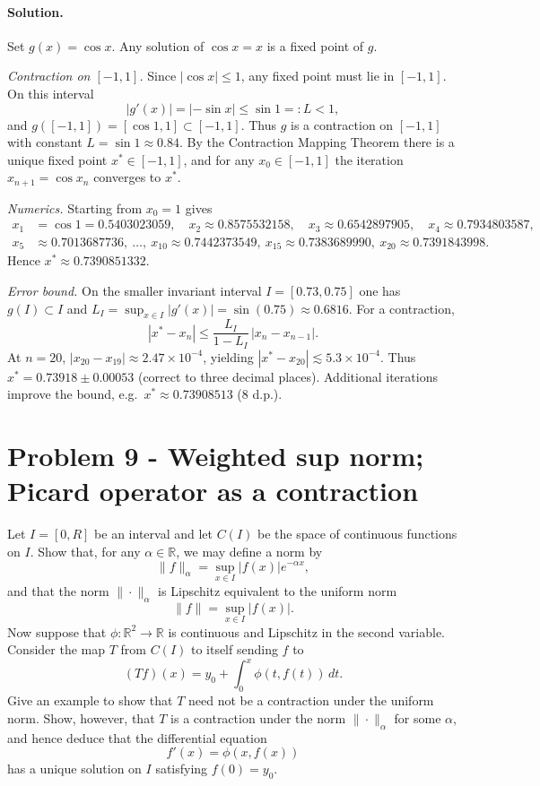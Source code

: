 \documentclass[12pt,a4paper]{article}
\theoremstyle{plain}
\theoremstyle{definition}
\theoremstyle{remark}
\theoremstyle{remark}
\begin{document}
\paragraph{Solution.}
Set $g(x)=\cos x$. Any solution of $\cos x=x$ is a fixed point of $g$.

\emph{Contraction on $[-1,1]$.}
Since $|\cos x|\le 1$, any fixed point must lie in $[-1,1]$. On this interval
\[
|g'(x)|=|-\sin x|\le \sin 1=:L<1,
\]
and $g([-1,1])=[\cos 1,1]\subset [-1,1]$. Thus $g$ is a contraction on $[-1,1]$
with constant $L=\sin 1\approx 0.84$. By the Contraction Mapping Theorem there is a unique
fixed point $x^\ast\in[-1,1]$, and for any $x_0\in[-1,1]$ the iteration $x_{n+1}=\cos x_n$
converges to $x^\ast$.

\emph{Numerics.}
Starting from $x_0=1$ gives
\[
\begin{aligned}
	x_1&=\cos 1=0.5403023059,\quad
	x_2\approx 0.8575532158,\quad
	x_3\approx 0.6542897905,\quad
	x_4\approx 0.7934803587,\\
	x_5&\approx 0.7013687736,\ \ldots,\
	x_{10}\approx 0.7442373549,\
	x_{15}\approx 0.7383689990,\
	x_{20}\approx 0.7391843998.
\end{aligned}
\]
Hence $x^\ast\approx 0.7390851332$.

\emph{Error bound.}
On the smaller invariant interval $I=[0.73,0.75]$ one has
$g(I)\subset I$ and $L_I=\sup_{x\in I}|g'(x)|=\sin(0.75)\approx 0.6816$.
For a contraction,
\[
|x^\ast-x_n|\le \frac{L_I}{1-L_I}\,|x_n-x_{n-1}|.
\]
At $n=20$, $|x_{20}-x_{19}|\approx 2.47\times 10^{-4}$, yielding
$|x^\ast-x_{20}|\lesssim 5.3\times 10^{-4}$. Thus $x^\ast=0.73918\pm 0.00053$
(correct to three decimal places). Additional iterations improve the bound,
e.g.\ $x^\ast\approx 0.73908513$ (8 d.p.).

\section*{Problem 9 - Weighted sup norm; Picard operator as a contraction}
Let $I=[0,R]$ be an interval and let $C(I)$ be the space of continuous functions on $I$.
Show that, for any $\alpha\in\mathbb{R}$, we may define a norm by
\[
\|f\|_\alpha=\sup_{x\in I}|f(x)|e^{-\alpha x},
\]
and that the norm $\|\cdot\|_\alpha$ is Lipschitz equivalent to the uniform norm
\[
\|f\|=\sup_{x\in I}|f(x)|.
\]
Now suppose that $\phi:\mathbb{R}^2\to\mathbb{R}$ is continuous and Lipschitz in the second variable.
Consider the map $T$ from $C(I)$ to itself sending $f$ to
\[
(Tf)(x)=y_0+\int_0^x \phi(t,f(t))\,dt.
\]
Give an example to show that $T$ need not be a contraction under the uniform norm.
Show, however, that $T$ is a contraction under the norm $\|\cdot\|_\alpha$ for some $\alpha$, and hence deduce that the differential equation
\[
f'(x)=\phi(x,f(x))
\]
has a unique solution on $I$ satisfying $f(0)=y_0$.
\end{document}

